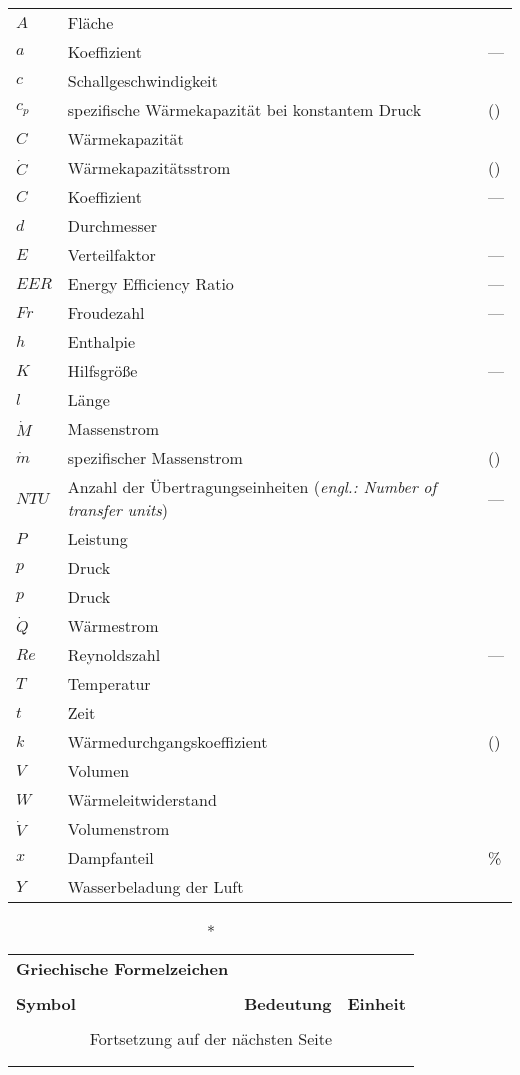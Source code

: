\begin{onehalfspacing}
\begin{longtable}[h]{p{} p{} p{}}
		$A$ & Fläche & \squaremetre\\
		$a$&Koeffizient&---\\
		$c$ & Schallgeschwindigkeit & \metre\per\second\\
		$c_{p}$&spezifische Wärmekapazität bei konstantem Druck&\joule\per(\kilogram\usk\kelvin)\\
		$C$&Wärmekapazität&\watt\per\kilogram\\		
		$\dot{C}$&Wärmekapazitätsstrom&\watt\per(\kilogram\usk\second)\\
		$C$&Koeffizient&---\\
		$d$ & Durchmesser & \metre\\
		$E$ & Verteilfaktor & ---\\
		$EER$ & Energy Efficiency Ratio & ---\\
		$Fr$&Froudezahl& ---\\
		$h $ & Enthalpie & \joule\\	
		$K$&Hilfsgröße&---\\
		$l$ & Länge & \metre\\
		$\dot{M}$ & Massenstrom & \kilogram\per\second\\	
		$\dot{m}$ & spezifischer Massenstrom & \kilogram\per(\second\usk\metre)\\
		$NTU$ &Anzahl der Übertragungseinheiten (\emph{engl.: Number of transfer units}) & ---\\
		$P$ & Leistung & \watt\\		
		$p$ & Druck & \pascal\\
		$p$ & Druck & \bbar\\
		$\dot{Q}$ & Wärmestrom & \watt\\
		$Re$ & Reynoldszahl & ---\\
		$T$ & Temperatur & \kelvin\\
		$t$ & Zeit & \second\\
		$k$ & Wärmedurchgangskoeffizient & \watt\per(\squaremetre\usk\kelvin)\\		
		$V$ & Volumen & \cubic\meter\\
		$W$ & Wärmeleitwiderstand & \kelvin\per\watt\\
		$\dot{V}$&Volumenstrom&\cubic\meter\per\second\\
		$x$ & Dampfanteil & \%\\
		$Y$ & Wasserbeladung der Luft & \gram\per\kilogram\\
		
		
\end{longtable}

\begin{longtable}[h]{p{} p{} p{}}
		\caption*{\textbf{Griechische Formelzeichen}} \\
		\\
		\textbf{Symbol} & \textbf{Bedeutung} & \textbf{Einheit} \\ %
		\endhead
		\\
		\multicolumn{3}{c}{Fortsetzung auf der nächsten Seite} \\
		\endfoot
		\multicolumn{3}{c}{ } \\
		\endlastfoot



\end{longtable}
\end{onehalfspacing}
